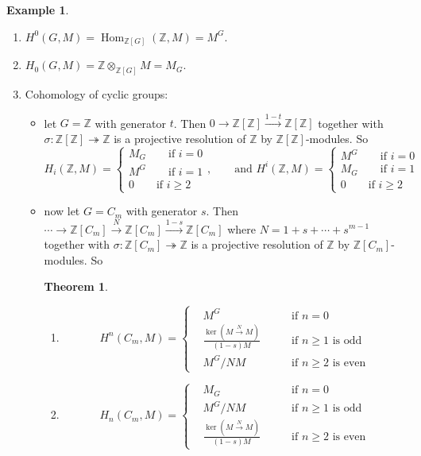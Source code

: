 \documentclass{article}
\newcommand{\Z}{\mathbb{Z}}
\newcommand{\Hom}{\operatorname{Hom}}
\theoremstyle{definition}
\newtheorem{thm}[defn]{Theorem}
\newtheorem{example}[defn]{Example}
\begin{document}
\begin{example}
\label{example:grpcohomo}
\begin{enumerate}
\item $H^0(G,M)=\Hom_{\Z[G]}(\Z,M)=M^G$.
\item $H_0(G,M)=\Z\otimes_{\Z[G]}M=M_G$.
\item Cohomology of cyclic groups: \begin{itemize}
\item let $G=\Z$ with generator $t$. Then $0\rightarrow\Z[\Z]\xrightarrow{1-t}\Z[\Z]$ together with $\sigma:\Z[\Z]\twoheadrightarrow\Z$ is a projective resolution of $\Z$ by $\Z[\Z]$-modules. So
\[
H_i(\Z,M)=\left\{
\begin{aligned}
M_G \qquad\text{if }i=0 \\
M^G \qquad\text{if }i=1 \\
0 \qquad\text{if }i\geq 2
\end{aligned}
\right. ,\qquad \text{and } H^i(\Z,M)=\left\{
\begin{aligned}
M^G \qquad\text{if }i=0 \\
M_G \qquad\text{if }i=1 \\
0 \qquad\text{if }i\geq 2
\end{aligned}
\right.
\]
\item now let $G=C_m$ with generator $s$. Then $\cdots\rightarrow\Z[C_m]\xrightarrow{N}\Z[C_m]\xrightarrow{1-s}\Z[C_m]$ where $N=1+s+\cdots+s^{m-1}$ together with $\sigma:\Z[C_m]\twoheadrightarrow\Z$ is a projective resolution of $\Z$ by $\Z[C_m]$-modules. So
\begin{thm}
\begin{enumerate}
\item
\[
H^n(C_m,M)=\left\{
\begin{aligned}
&M^G \qquad &\text{if }n=0\\
&\frac{\ker(M\xrightarrow{N}M)}{(1-s)M} \qquad &\text{if }n\geq 1\text{ is odd} \\
& M^G/NM\qquad&\text{if }n\geq 2\text{ is even}
\end{aligned}
\right.
\]
\item
\[
H_n(C_m,M)=\left\{
\begin{aligned}
&M_G \qquad &\text{if }n=0\\
&M^G/NM \qquad &\text{if }n\geq 1\text{ is odd} \\
& \frac{\ker(M\xrightarrow{N}M)}{(1-s)M}\qquad&\text{if }n\geq 2\text{ is even}
\end{aligned}
\right.
\]
\end{enumerate}
\end{thm}
\end{itemize}
\end{enumerate}
\end{example}
\end{document}
